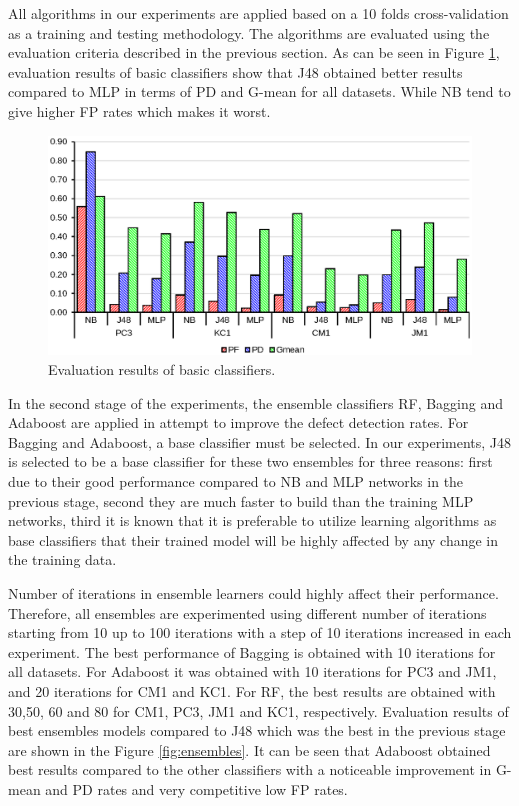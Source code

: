 \documentclass[runningheads,a4paper]{llncs}
\begin{document}
All algorithms in our experiments are applied based on a 10 folds cross-validation as a training and testing methodology. The algorithms are evaluated using the evaluation criteria described in the previous section. As can be seen in Figure  \ref{fig:basic}, evaluation results of basic classifiers show that J48 obtained better results compared to MLP in terms of PD and G-mean for all datasets. While NB tend to give higher FP rates which makes it worst. 



\begin{figure}[h]
\centering
\includegraphics[scale=0.6]{basicresults.eps}
\caption{Evaluation results of basic classifiers.}
\label{fig:basic}
\end{figure}


In the second stage of the experiments, the ensemble classifiers RF, Bagging and Adaboost are applied in attempt to improve the defect detection rates. For Bagging and Adaboost, a base classifier must be selected. In our experiments, J48 is selected to be a base classifier for these two ensembles for three reasons: first due to their good performance compared to NB and MLP networks in the previous stage, second they are much faster to build than the training MLP networks, third it is known that it is preferable to utilize learning algorithms as base classifiers that their trained model will be highly affected by any change in the training data. 

Number of iterations in ensemble learners could highly affect their performance. Therefore, all ensembles are experimented using different number of iterations starting from 10 up to 100 iterations with a step of 10 iterations increased in each experiment. The best performance of Bagging is obtained with 10 iterations for all datasets. For Adaboost it was obtained with 10 iterations for PC3 and JM1, and 20 iterations for CM1 and KC1. For RF, the best results are obtained with 30,50, 60 and 80 for CM1, PC3, JM1 and KC1, respectively. Evaluation results of best ensembles models compared to J48 which was the best in the previous stage are shown in the Figure \ref{fig:ensembles}. It can be seen that Adaboost obtained best results compared to the other classifiers with a noticeable improvement in G-mean and PD rates and very competitive low FP rates.
\end{document}
